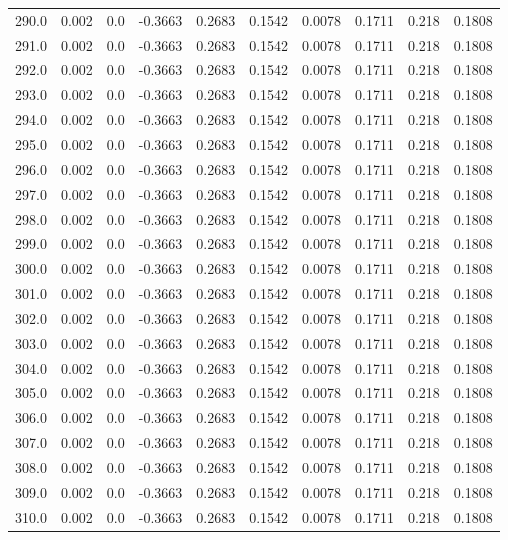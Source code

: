 \begin{longtable}{lrrrrrrrrr}
290.0 & 0.002 & 0.0 & -0.3663 & 0.2683 & 0.1542 & 0.0078 & 0.1711 & 0.218 & 0.1808 \\
291.0 & 0.002 & 0.0 & -0.3663 & 0.2683 & 0.1542 & 0.0078 & 0.1711 & 0.218 & 0.1808 \\
292.0 & 0.002 & 0.0 & -0.3663 & 0.2683 & 0.1542 & 0.0078 & 0.1711 & 0.218 & 0.1808 \\
293.0 & 0.002 & 0.0 & -0.3663 & 0.2683 & 0.1542 & 0.0078 & 0.1711 & 0.218 & 0.1808 \\
294.0 & 0.002 & 0.0 & -0.3663 & 0.2683 & 0.1542 & 0.0078 & 0.1711 & 0.218 & 0.1808 \\
295.0 & 0.002 & 0.0 & -0.3663 & 0.2683 & 0.1542 & 0.0078 & 0.1711 & 0.218 & 0.1808 \\
296.0 & 0.002 & 0.0 & -0.3663 & 0.2683 & 0.1542 & 0.0078 & 0.1711 & 0.218 & 0.1808 \\
297.0 & 0.002 & 0.0 & -0.3663 & 0.2683 & 0.1542 & 0.0078 & 0.1711 & 0.218 & 0.1808 \\
298.0 & 0.002 & 0.0 & -0.3663 & 0.2683 & 0.1542 & 0.0078 & 0.1711 & 0.218 & 0.1808 \\
299.0 & 0.002 & 0.0 & -0.3663 & 0.2683 & 0.1542 & 0.0078 & 0.1711 & 0.218 & 0.1808 \\
300.0 & 0.002 & 0.0 & -0.3663 & 0.2683 & 0.1542 & 0.0078 & 0.1711 & 0.218 & 0.1808 \\
301.0 & 0.002 & 0.0 & -0.3663 & 0.2683 & 0.1542 & 0.0078 & 0.1711 & 0.218 & 0.1808 \\
302.0 & 0.002 & 0.0 & -0.3663 & 0.2683 & 0.1542 & 0.0078 & 0.1711 & 0.218 & 0.1808 \\
303.0 & 0.002 & 0.0 & -0.3663 & 0.2683 & 0.1542 & 0.0078 & 0.1711 & 0.218 & 0.1808 \\
304.0 & 0.002 & 0.0 & -0.3663 & 0.2683 & 0.1542 & 0.0078 & 0.1711 & 0.218 & 0.1808 \\
305.0 & 0.002 & 0.0 & -0.3663 & 0.2683 & 0.1542 & 0.0078 & 0.1711 & 0.218 & 0.1808 \\
306.0 & 0.002 & 0.0 & -0.3663 & 0.2683 & 0.1542 & 0.0078 & 0.1711 & 0.218 & 0.1808 \\
307.0 & 0.002 & 0.0 & -0.3663 & 0.2683 & 0.1542 & 0.0078 & 0.1711 & 0.218 & 0.1808 \\
308.0 & 0.002 & 0.0 & -0.3663 & 0.2683 & 0.1542 & 0.0078 & 0.1711 & 0.218 & 0.1808 \\
309.0 & 0.002 & 0.0 & -0.3663 & 0.2683 & 0.1542 & 0.0078 & 0.1711 & 0.218 & 0.1808 \\
310.0 & 0.002 & 0.0 & -0.3663 & 0.2683 & 0.1542 & 0.0078 & 0.1711 & 0.218 & 0.1808 \\

\end{longtable}
